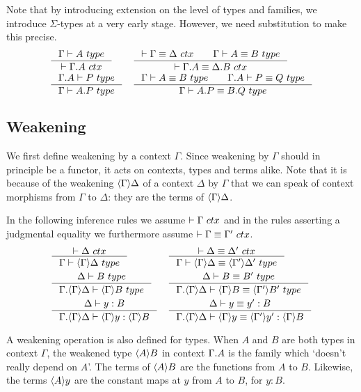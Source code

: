 Note that by introducing extension on the level of types and families,
we introduce $\Sigma$-types at a very early stage.
However, we need substitution to make this precise.
\begin{align}
& \inference{\jtype{\Gamma}{A}}{\jctx{\ctxext{\Gamma}{A}}}
& & \inference{\jctxeq{\Gamma}{\Delta}\qquad\jtypeeq{\Gamma}{A}{B}}{\jctxeq{\ctxext{\Gamma}{A}}{\ctxext{\Delta}{B}}}\\
& \inference{\jtype{\ctxext{\Gamma}{A}}{P}}{\jtype{\Gamma}{\ctxext{A}{P}}}
& & \inference{\jtypeeq{\Gamma}{A}{B}\qquad\jtypeeq{\ctxext{\Gamma}{A}}{P}{Q}}{\jtypeeq{\Gamma}{\ctxext{A}{P}}{\ctxext{B}{Q}}}
\end{align}

\subsection{Weakening}
We first define weakening by a context $\Gamma$. Since weakening by $\Gamma$
should in principle be a functor, it acts on contexts, types and terms alike.
Note that it is because of the weakening $\ctxwk{\Gamma}{\Delta}$ of a context
$\Delta$ by $\Gamma$ that we can speak of context morphisms from $\Gamma$ to $\Delta$: they are the terms
of $\ctxwk{\Gamma}{\Delta}$.

In the following inference rules we assume $\jctx{\Gamma}$ and in the rules
asserting a judgmental equality we furthermore assume $\jctxeq{\Gamma}{\Gamma'}$.
\begin{align}
& \inference{\jctx{\Delta}}{\jtype{\Gamma}{\ctxwk{\Gamma}{\Delta}}} 
& & \inference{\jctxeq{\Delta}{\Delta'}}{\jtypeeq{\Gamma}{\ctxwk{\Gamma}{\Delta}}{\ctxwk{\Gamma'}{\Delta'}}}\\
& \inference{\jtype{\Delta}{B}}{\jtype{\ctxext{\Gamma}{\ctxwk{\Gamma}{\Delta}}}{\ctxwk{\Gamma}{B}}}
& & \inference{\jtypeeq{\Delta}{B}{B'}}{\jtypeeq{\ctxext{\Gamma}{\ctxwk{\Gamma}{\Delta}}}{\ctxwk{\Gamma}{B}}{\ctxwk{\Gamma'}{B'}}}\\
& \inference{\jterm{\Delta}{B}{y}}{\jterm{\ctxext{\Gamma}{\ctxwk{\Gamma}{\Delta}}}{\ctxwk{\Gamma}{B}}{\ctxwk{\Gamma}{y}}} 
& & \inference{\jtermeq{\Delta}{B}{y}{y'}}{\jtermeq{\ctxext{\Gamma}{\ctxwk{\Gamma}{\Delta}}}{\ctxwk{\Gamma}{B}}{\ctxwk{\Gamma}{y}}{\ctxwk{\Gamma'}{y'}}} 
\end{align}

A weakening operation is also defined for types. When $A$ and $B$ are both types
 in context $\Gamma$, the weakened type $\ctxwk{A}{B}$ in context $\ctxext{\Gamma}{A}$
 is the family which `doesn't really depend on $A$'. The terms of $\ctxwk{A}{B}$
 are the functions from $A$ to $B$. Likewise, the terms $\ctxwk{A}{y}$ are the
 constant maps at $y$ from $A$ to $B$, for $y:B$.
 
